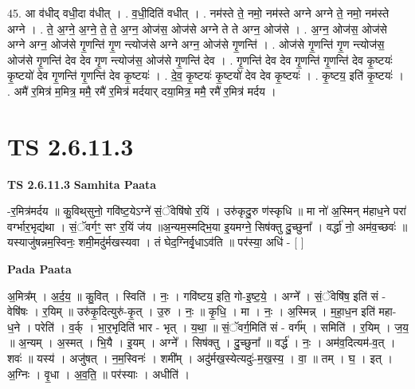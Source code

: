 \documentclass[17pt]{extarticle}
\begin{document}
45. आ व॑धीद् वधी॒दा व॑धीत् । . व॒धी॒दिति॑ वधीत् । . नम॑स्ते ते॒ नमो॒ नम॑स्ते अग्ने अग्ने ते॒ नमो॒ नम॑स्ते अग्ने । . ते॒ अ॒ग्ने॒ अ॒ग्ने॒ ते॒ ते॒ अ॒ग्न॒ ओज॑स॒ ओज॑से अग्ने ते ते अग्न॒ ओज॑से । . अ॒ग्न॒ ओज॑स॒ ओज॑से अग्ने अग्न॒ ओज॑से गृ॒णन्ति॑ गृ॒ण न्त्योज॑से अग्ने अग्न॒ ओज॑से गृ॒णन्ति॑ । . ओज॑से गृ॒णन्ति॑ गृ॒ण न्त्योज॑स॒ ओज॑से गृ॒णन्ति॑ देव देव गृ॒ण न्त्योज॑स॒ ओज॑से गृ॒णन्ति॑ देव । . गृ॒णन्ति॑ देव देव गृ॒णन्ति॑ गृ॒णन्ति॑ देव कृ॒ष्टयः॑ कृ॒ष्टयो॑ देव गृ॒णन्ति॑ गृ॒णन्ति॑ देव कृ॒ष्टयः॑ । . दे॒व॒ कृ॒ष्टयः॑ कृ॒ष्टयो॑ देव देव कृ॒ष्टयः॑ । . कृ॒ष्टय॒ इति॑ कृ॒ष्टयः॑ । . अमै॑ र॒मित्र॑ म॒मित्र॒ ममै॒ रमै॑ र॒मित्र॑ मर्दयार् दया॒मित्र॒ ममै॒ रमै॑ र॒मित्र॑ मर्दय । \newline
\pagebreak
{}

\section{ TS 2.6.11.3 }

\textbf{TS 2.6.11.3 } \newline
\textbf{Samhita Paata} \newline

-र॒मित्र॑मर्दय ॥ कु॒विथ्‌सुनो॒ गवि॑ष्ट॒येऽग्ने॑ सं॒ॅवेषि॑षो र॒यिं । उरु॑कृदु॒रु ण॑स्कृधि ॥ मा नो॑ अ॒स्मिन् म॑हाध॒ने परा॑ वर्ग्भार॒भृद्य॑था । सं॒ॅवर्गꣳ॒॒ सꣳ र॒यिं ज॑य ॥अ॒न्यम॒स्मद्भि॒या इ॒यमग्ने॒ सिष॑क्तु दु॒च्छुना᳚ । वर्द्धा॑ नो॒ अम॑व॒च्छवः॑ ॥ यस्याजु॑षन्नम॒स्विनः॒ शमी॒मदु॑र्मखस्यवा । तं घेद॒ग्निर्वृ॒धाऽव॑ति ॥ पर॑स्या॒ अधि॑ - [  ] \newline

\textbf{Pada Paata} \newline

अ॒मित्र᳚म् । अ॒र्द॒य॒ ॥ कु॒वित् । स्विति॑ । नः॒ । गवि॑ष्टय॒ इति॒ गो-इ॒ष्ट॒ये॒ । अग्ने᳚ । सं॒ॅवेषि॑ष॒ इति॑ सं - वेषि॑षः । र॒यिम् ॥ उरु॑कृ॒दित्युरु॑-कृ॒त् । उ॒रु । नः॒ ॥ कृ॒धि॒ । मा । नः॒ । अ॒स्मिन्न् । म॒हा॒ध॒न इति॑ महा-ध॒ने । परेति॑ । व॒र्क् । भा॒र॒भृदिति॑ भार - भृत् । य॒था॒ ॥ सं॒ॅवर्ग॒मिति॑ सं - वर्ग᳚म् । समिति॑ । र॒यिम् । ज॒य॒ ॥ अ॒न्यम् । अ॒स्मत् । भि॒यै । इ॒यम् । अग्ने᳚ । सिष॑क्तु । दु॒च्छुना᳚ ॥ वर्द्ध॑ । नः॒ । अम॑व॒दित्यम॑-व॒त् । शवः॑ ॥ यस्य॑ । अजु॑षत् । न॒म॒स्विनः॑ । शमी᳚म् । अदु॑र्मख॒स्येत्यदुः॑-म॒ख॒स्य॒ । वा॒ ॥ तम् । घ॒ । इत् । अ॒ग्निः । वृ॒धा । अ॒व॒ति॒ ॥ पर॑स्याः । अधीति॑ ।  \newline
\end{document}
